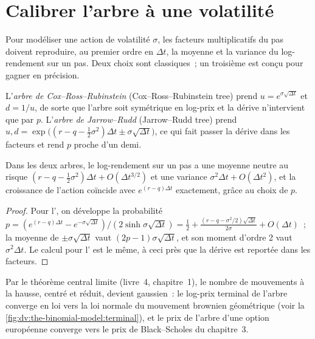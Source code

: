 \section{Calibrer l'arbre à une volatilité}

Pour modéliser une action de volatilité $\sigma$, les facteurs multiplicatifs du pas doivent reproduire, au premier
ordre en $\Delta t$, la moyenne et la variance du log-rendement sur un pas. Deux
choix sont classiques~; un troisième est conçu pour gagner en précision.

\begin{definition}\label{def:dv:the-binomial-model:crr}
L'\emph{arbre de Cox--Ross--Rubinstein} (Cox--Ross--Rubinstein tree) prend
$u=e^{\sigma\sqrt{\Delta t}}$ et $d=1/u$, de sorte que l'arbre soit symétrique en
log-prix et la dérive n'intervient que par $p$. L'\emph{arbre de
Jarrow--Rudd} (Jarrow--Rudd tree) prend
$u,d=\exp\bigl((r-q-\tfrac12\sigma^2)\Delta t\pm\sigma\sqrt{\Delta t}\bigr)$, ce qui
fait passer la dérive dans les facteurs et rend $p$ proche d'un demi.
\end{definition}

\begin{proposition}\label{prop:dv:the-binomial-model:moments}
Dans les deux arbres, le log-rendement sur un pas a une moyenne neutre au risque
$(r-q-\tfrac12\sigma^2)\Delta t+O(\Delta t^{3/2})$ et une variance
$\sigma^2\Delta t+O(\Delta t^2)$, et la croissance de l'action coïncide avec
$e^{(r-q)\Delta t}$ exactement, grâce au choix de $p$.
\end{proposition}
\begin{proof}
Pour l', on développe la probabilité
$p=(e^{(r-q)\Delta t}-e^{-\sigma\sqrt{\Delta t}})/(2\sinh\sigma\sqrt{\Delta t})=
\tfrac12+\tfrac{(r-q-\sigma^2/2)\sqrt{\Delta t}}{2\sigma}+O(\Delta t)$~; la moyenne de
$\pm\sigma\sqrt{\Delta t}$ vaut $(2p-1)\sigma\sqrt{\Delta t}$, et son moment d'ordre 2
vaut $\sigma^2\Delta t$. Le calcul pour l' est le même, à ceci près que la dérive
est reportée dans les facteurs.
\end{proof}

Par le théorème central limite (livre~4, chapitre~1), le nombre de mouvements à la hausse,
centré et réduit, devient gaussien~: le log-prix terminal de l'arbre converge
en loi vers la loi normale du mouvement brownien géométrique
(voir la \cref{fig:dv:the-binomial-model:terminal}), et le prix de l'arbre d'une option européenne
converge vers le prix de Black--Scholes du chapitre~3.


